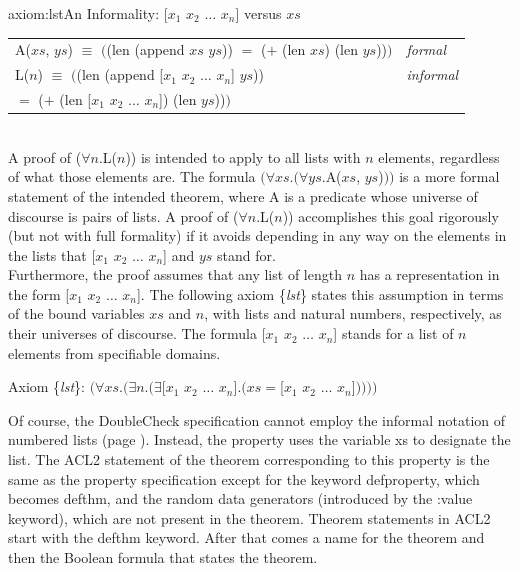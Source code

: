 \begin{aside}{axiom:lst}{An Informality: \textsf{[$x_1$ $x_2$ $\dots$ $x_n$]} versus $xs$}
\begin{center}
\begin{tabular}{ll}
A($xs$, $ys$) $\equiv$ $($\textsf{(len (append $xs$ $ys$))} $=$
\textsf{($+$ (len $xs$) (len $ys$))}$)$ & \emph{formal} \\
L($n$) $\equiv$ $($\textsf{(len (append [$x_1$ $x_2$ $\dots$ $x_n$] $ys$))} & \emph{informal}\\
\phantom{L($n$) $\equiv$ $($~~~~} $=$ \textsf{($+$ (len [$x_1$ $x_2$ $\dots$ $x_n$]) (len $ys$))}$)$ \\
\end{tabular}
\end{center}
~\\
A proof of ($\forall$$n$.L($n$))
is intended to apply to all lists with $n$ elements,
regardless of what those elements are.
The formula $(\forall xs.(\forall ys.$A($xs$, $ys$)$))$
is a more formal statement of the intended theorem,
where A is a predicate whose universe of discourse
is pairs of lists.
A proof of ($\forall$$n$.L($n$)) accomplishes this goal
rigorously (but not with full formality)
if it avoids depending in any way on the elements in the lists that
\textsf{[$x_1$ $x_2$ $\dots$ $x_n$]} and $ys$ stand for.
~\vspace{2mm}\\
Furthermore, the proof assumes that any list of length $n$
has a representation in the form \textsf{[$x_1$ $x_2$ $\dots$ $x_n$]}.
The following axiom \{\emph{lst}\} states this assumption in terms of
the bound variables $xs$ and $n$,
with lists and natural numbers, respectively, as their
universes of discourse. The formula
\textsf{[$x_1$ $x_2$ $\dots$ $x_n$]} stands for a list of $n$
elements from specifiable domains.
\begin{center}
  Axiom \{\emph{lst}\}: $(\forall xs.(\exists n.(\exists$\textsf{[$x_1$ $x_2$ $\dots$ $x_n$]}$.(xs =
  $\textsf{[$x_1$ $x_2$ $\dots$ $x_n$]}$))))$
\end{center}
\label{axiom:lst}
\end{aside}

Of course, the DoubleCheck specification
cannot employ the informal notation of numbered lists
(page \pageref{numbered-list-interpretation}).
Instead, the property uses the variable \textsf{xs} to designate the list.
The ACL2 statement of the theorem corresponding to this property
is the same as the property specification
except for the keyword \textsf{defproperty},
which becomes \textsf{defthm}, and
the random data generators (introduced
by the \textsf{:value} keyword), which are not present in the theorem.
Theorem statements in ACL2 start with the
\textsf{defthm} keyword.
After that comes a name for the theorem and then the Boolean formula
that states the theorem.

